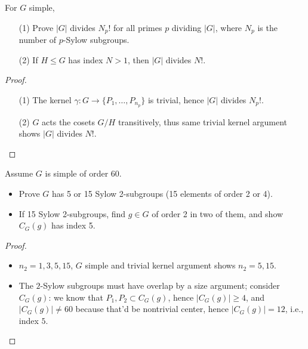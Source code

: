 \documentclass[openany]{book}
\begin{document}
\begin{prob}[2.23]
For \( G \) simple, 
\begin{itemize}
    \item[(1)] Prove \( |G| \) divides \( N_p! \) for all primes \( p \) dividing \( |G| \), where \( N_p \) is the number of \( p \)-Sylow subgroups. 
    \item[(2)] If \( H \leq G \) has index \( N > 1 \), then \( |G| \) divides \( N! \). 
\end{itemize}
\end{prob}
\begin{proof}
    \begin{itemize}
        \item[(1)] The kernel $\gamma: G \to \{P_1,\dots, P_{n_p}\}$ is trivial, hence $|G|$ divides $N_p!$.
        \item[(2)] $G$ acts the cosets $G/H$ transitively, thus same trivial kernel argument shows $|G|$ divides $N!$. 
    \end{itemize}
\end{proof}


\begin{prob}[2.25]
Assume \( G \) is simple of order 60.
\begin{itemize}
    \item Prove \( G \) has 5 or 15 Sylow 2-subgroups (15 elements of order 2 or 4).
    \item If 15 Sylow 2-subgroups, find \( g \in G \) of order 2 in two of them, and show \( C_G(g) \) has index 5.
\end{itemize}
\end{prob}
\begin{proof}
    \begin{itemize}
        \item $n_2=1,3,5,15$, $G$ simple and trivial kernel argument shows $n_2=5,15$.
        \item The $2$-Sylow subgroups must have overlap by a size argument; consider $C_G(g)$: we know that $P_1,P_2\subset C_G(g)$, hence $|C_G(g)|\geq 4$, and $|C_G(g)|\neq 60$ because that'd be nontrivial center, hence $|C_G(g)|=12$, i.e., index $5$.
    \end{itemize}
\end{proof}
\end{document}
